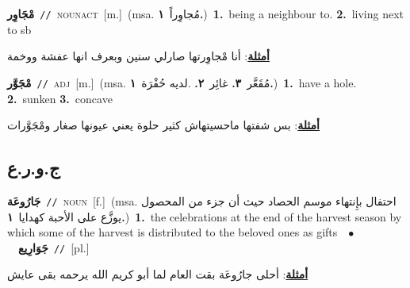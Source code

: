 \documentclass[10pt,a4paper,twoside]{article} %
\begin{document}
\begin{multicols}{2}
{\setlength\topsep{0pt}\textbf{\foreignlanguage{arabic}{مْجَاوِر}}\ {\color{gray}\texttt{//}\color{black}}\ \textsc{noun\textunderscore act}\ [m.]\ \color{gray}(msa. \foreignlanguage{arabic}{مُجاوِراً}~\foreignlanguage{arabic}{\textbf{١.}})\color{black}\ \textbf{1.}~being a neighbour to.  \textbf{2.}~living next to sb\  \begin{flushright}\color{gray}\foreignlanguage{arabic}{\textbf{\underline{\foreignlanguage{arabic}{أمثلة}}}: أنا مْجاوِرتها صارلي سنين وبعرف انها عفشة ووخمة}\end{flushright}\color{black}} \vspace{2mm}

{\setlength\topsep{0pt}\textbf{\foreignlanguage{arabic}{مْجَوَّر}}\ {\color{gray}\texttt{//}\color{black}}\ \textsc{adj}\ [m.]\ \color{gray}(msa. \foreignlanguage{arabic}{مُقَعَّر}~\foreignlanguage{arabic}{\textbf{٣.}}  \foreignlanguage{arabic}{غائِر}~\foreignlanguage{arabic}{\textbf{٢.}}  .\foreignlanguage{arabic}{لديه حُفْرَة}~\foreignlanguage{arabic}{\textbf{١.}})\color{black}\ \textbf{1.}~have a hole.  \textbf{2.}~sunken  \textbf{3.}~concave\  \begin{flushright}\color{gray}\foreignlanguage{arabic}{\textbf{\underline{\foreignlanguage{arabic}{أمثلة}}}: بس شفتها ماحسيتهاش كثير حلوة يعني عيونها صغار ومْجَوَّرات}\end{flushright}\color{black}} \vspace{2mm}

\vspace{-3mm}
\subsection*{\color{blue}\foreignlanguage{arabic}{ج.و.ر.ع}\color{blue}{}} 

{\setlength\topsep{0pt}\textbf{\foreignlanguage{arabic}{جَارُوعَة}}\ {\color{gray}\texttt{//}\color{black}}\ \textsc{noun}\ [f.]\ \color{gray}(msa. \foreignlanguage{arabic}{احتفال بإِنتهاء موسم الحصاد حيث أن جزء من المحصول يوزَّع على الأحبة كهدايا}~\foreignlanguage{arabic}{\textbf{١.}})\color{black}\ \textbf{1.}~the celebrations at the end of the harvest season by which some of the harvest is distributed to the beloved ones as gifts\ \ $\bullet$\ \ \setlength\topsep{0pt}\textbf{\foreignlanguage{arabic}{جَوَارِيع}}\ {\color{gray}\texttt{//}\color{black}}\ [pl.]\  \begin{flushright}\color{gray}\foreignlanguage{arabic}{\textbf{\underline{\foreignlanguage{arabic}{أمثلة}}}: أحلى جارُوعَة بقت العام لما أبو كريم الله يرحمه بقى عايش}\end{flushright}\color{black}} \vspace{2mm}


\end{multicols}
\end{document}
